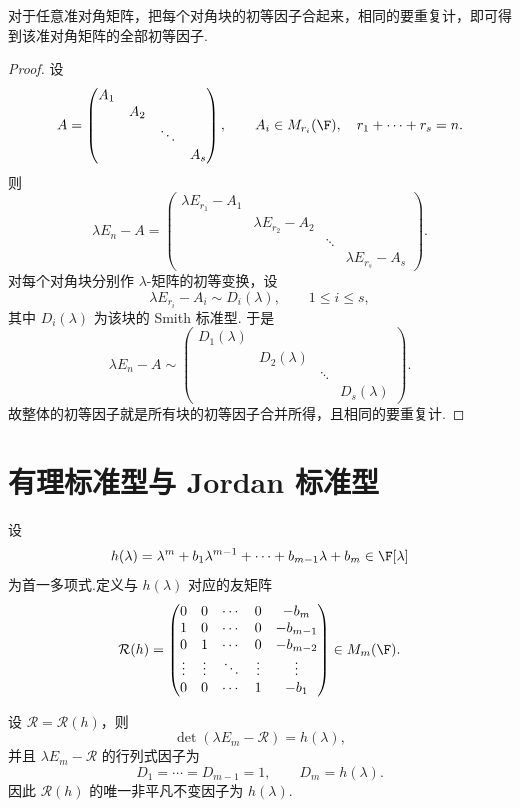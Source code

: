 \begin{corollary}
对于任意准对角矩阵，把每个对角块的初等因子合起来，相同的要重复计，即可得到该准对角矩阵的全部初等因子.
\end{corollary}

\begin{proof}
设
\[
A=\begin{pmatrix}
	A_1&&&\\
	&A_2&&\\
	&&\ddots&\\
	&&&A_s
\end{pmatrix},
\qquad
A_i\in M_{r_i}(\F),
\quad r_1+\cdots+r_s=n.
\]
则
\[
\lambda E_n-A=
\begin{pmatrix}
	\lambda E_{r_1}-A_1&&&\\
	&\lambda E_{r_2}-A_2&&\\
	&&\ddots&\\
	&&&\lambda E_{r_s}-A_s
\end{pmatrix}.
\]
对每个对角块分别作 $\lambda$-矩阵的初等变换，设
\[
\lambda E_{r_i}-A_i\sim D_i(\lambda),
\qquad 1\leq i\leq s,
\]
其中 $D_i(\lambda)$ 为该块的 Smith 标准型. 于是
\[
\lambda E_n-A
\sim
\begin{pmatrix}
	D_1(\lambda)&&&\\
	&D_2(\lambda)&&\\
	&&\ddots&\\
	&&&D_s(\lambda)
\end{pmatrix}.
\]
故整体的初等因子就是所有块的初等因子合并所得，且相同的要重复计.
\end{proof}

\section{有理标准型与 Jordan 标准型}

设
\[
h(\lambda)=\lambda^m+b_1\lambda^{m-1}+\cdots+b_{m-1}\lambda+b_m\in\F[\lambda]
\]
为首一多项式.定义与 $h(\lambda)$ 对应的友矩阵
\[
\mathcal{R}(h)=
\begin{pmatrix}
	0&0&\cdots&0&-b_m\\
	1&0&\cdots&0&-b_{m-1}\\
	0&1&\cdots&0&-b_{m-2}\\
	\vdots&\vdots&\ddots&\vdots&\vdots\\
	0&0&\cdots&1&-b_1
\end{pmatrix}\in M_m(\F).
\]


\begin{lemma}
	设 $\mathcal{R}=\mathcal{R}(h)$，则
	\[
	\det(\lambda E_m-\mathcal{R})=h(\lambda),
	\]
	并且 $\lambda E_m-\mathcal{R}$ 的行列式因子为
	\[
	D_1=\cdots=D_{m-1}=1,\qquad D_m=h(\lambda).
	\]
	因此 $\mathcal{R}(h)$ 的唯一非平凡不变因子为 $h(\lambda)$.
\end{lemma}

